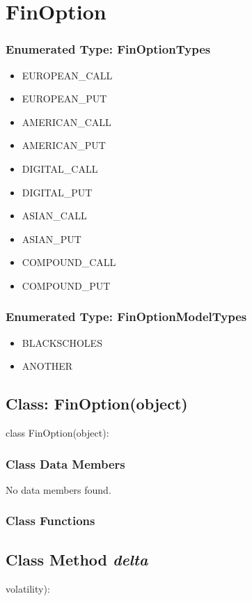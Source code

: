 \documentclass[twoside,11pt]{book}
\begin{document}
\newpage
\section{FinOption}

\subsubsection{Enumerated Type: FinOptionTypes}
\begin{itemize}
\item{EUROPEAN\_CALL}
\item{EUROPEAN\_PUT}
\item{AMERICAN\_CALL}
\item{AMERICAN\_PUT}
\item{DIGITAL\_CALL}
\item{DIGITAL\_PUT}
\item{ASIAN\_CALL}
\item{ASIAN\_PUT}
\item{COMPOUND\_CALL}
\item{COMPOUND\_PUT}
\end{itemize}

\subsubsection{Enumerated Type: FinOptionModelTypes}
\begin{itemize}
\item{BLACKSCHOLES}
\item{ANOTHER}
\end{itemize}

\subsection{Class: FinOption(object)}
class FinOption(object):

\subsubsection{Class Data Members}
No data members found.

\subsubsection{Class Functions}

\subsection{Class Method {\it delta}}
volatility):
\end{document}
